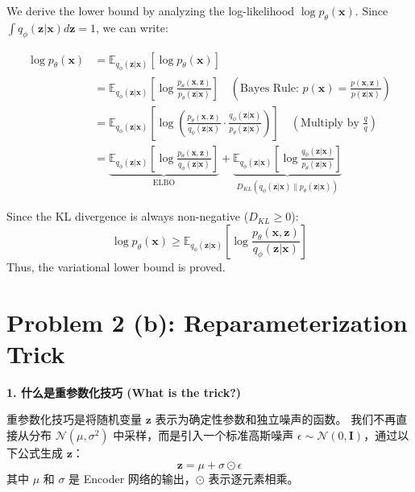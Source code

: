 \documentclass[12pt]{article}
\begin{document}
We derive the lower bound by analyzing the log-likelihood $\log p_\theta(\mathbf{x})$. Since $\int q_\phi(\mathbf{z}|\mathbf{x}) d\mathbf{z} = 1$, we can write:

\[
\begin{aligned}
    \log p_\theta(\mathbf{x}) 
    &= \mathbb{E}_{q_\phi(\mathbf{z}|\mathbf{x})} \left[ \log p_\theta(\mathbf{x}) \right] \\
    &= \mathbb{E}_{q_\phi(\mathbf{z}|\mathbf{x})} \left[ \log \frac{p_\theta(\mathbf{x}, \mathbf{z})}{p_\theta(\mathbf{z}|\mathbf{x})} \right] \quad (\text{Bayes Rule: } p(\mathbf{x}) = \frac{p(\mathbf{x},\mathbf{z})}{p(\mathbf{z}|\mathbf{x})}) \\
    &= \mathbb{E}_{q_\phi(\mathbf{z}|\mathbf{x})} \left[ \log \left( \frac{p_\theta(\mathbf{x}, \mathbf{z})}{q_\phi(\mathbf{z}|\mathbf{x})} \cdot \frac{q_\phi(\mathbf{z}|\mathbf{x})}{p_\theta(\mathbf{z}|\mathbf{x})} \right) \right] \quad (\text{Multiply by } \frac{q}{q}) \\
    &= \underbrace{\mathbb{E}_{q_\phi(\mathbf{z}|\mathbf{x})} \left[ \log \frac{p_\theta(\mathbf{x}, \mathbf{z})}{q_\phi(\mathbf{z}|\mathbf{x})} \right]}_{\text{ELBO}} + \underbrace{\mathbb{E}_{q_\phi(\mathbf{z}|\mathbf{x})} \left[ \log \frac{q_\phi(\mathbf{z}|\mathbf{x})}{p_\theta(\mathbf{z}|\mathbf{x})} \right]}_{D_{KL}(q_\phi(\mathbf{z}|\mathbf{x}) \| p_\theta(\mathbf{z}|\mathbf{x}))}
\end{aligned}
\]

Since the KL divergence is always non-negative ($D_{KL} \ge 0$):
\[
    \log p_\theta(\mathbf{x}) \ge \mathbb{E}_{q_\phi(\mathbf{z}|\mathbf{x})} \left[ \log \frac{p_\theta(\mathbf{x}, \mathbf{z})}{q_\phi(\mathbf{z}|\mathbf{x})} \right]
\]
Thus, the variational lower bound is proved.


\section*{Problem 2 (b): Reparameterization Trick}

\textbf{1. 什么是重参数化技巧 (What is the trick?)}

重参数化技巧是将随机变量 $\mathbf{z}$ 表示为确定性参数和独立噪声的函数。
我们不再直接从分布 $\mathcal{N}(\mu, \sigma^2)$ 中采样，而是引入一个标准高斯噪声 $\epsilon \sim \mathcal{N}(0, \mathbf{I})$，通过以下公式生成 $\mathbf{z}$：
\[
    \mathbf{z} = \mu + \sigma \odot \epsilon
\]
其中 $\mu$ 和 $\sigma$ 是 Encoder 网络的输出，$\odot$ 表示逐元素相乘。

\vspace{0.5cm}
\end{document}
